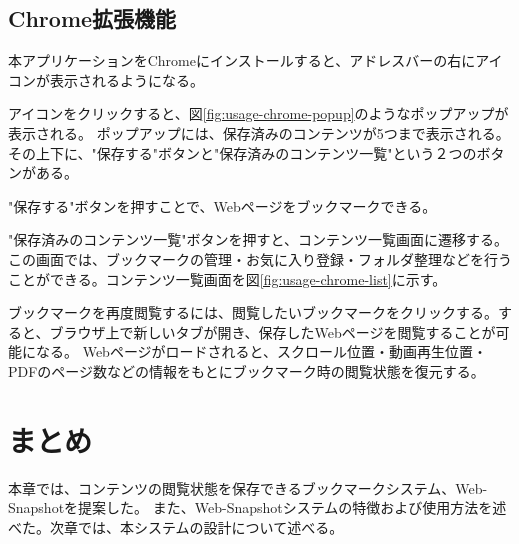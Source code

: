 \subsection{Chrome拡張機能}
本アプリケーションをChromeにインストールすると、アドレスバーの右にアイコンが表示されるようになる。

アイコンをクリックすると、図\ref{fig:usage-chrome-popup}のようなポップアップが表示される。
ポップアップには、保存済みのコンテンツが5つまで表示される。
その上下に、"保存する"ボタンと"保存済みのコンテンツ一覧"という２つのボタンがある。

"保存する"ボタンを押すことで、Webページをブックマークできる。



"保存済みのコンテンツ一覧"ボタンを押すと、コンテンツ一覧画面に遷移する。
この画面では、ブックマークの管理・お気に入り登録・フォルダ整理などを行うことができる。コンテンツ一覧画面を図\ref{fig:usage-chrome-list}に示す。



ブックマークを再度閲覧するには、閲覧したいブックマークをクリックする。すると、ブラウザ上で新しいタブが開き、保存したWebページを閲覧することが可能になる。
Webページがロードされると、スクロール位置・動画再生位置・PDFのページ数などの情報をもとにブックマーク時の閲覧状態を復元する。

\section{まとめ}
本章では、コンテンツの閲覧状態を保存できるブックマークシステム、Web-Snapshotを提案した。
また、Web-Snapshotシステムの特徴および使用方法を述べた。次章では、本システムの設計について述べる。

